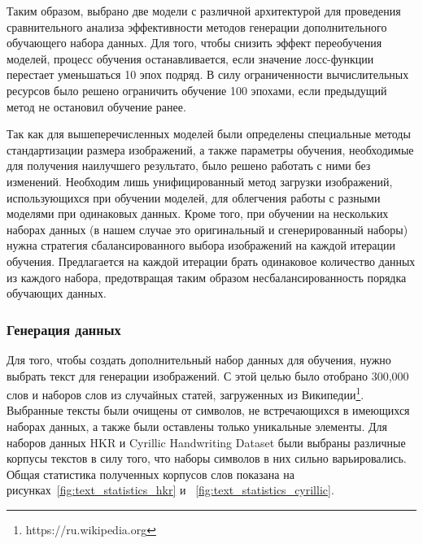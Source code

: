 Таким образом, выбрано две модели с различной архитектурой для проведения сравнительного анализа эффективности методов генерации дополнительного обучающего набора данных.
Для того, чтобы снизить эффект переобучения моделей, процесс обучения останавливается, если значение лосс-функции перестает уменьшаться 10 эпох подряд.
В силу ограниченности вычислительных ресурсов было решено ограничить обучение 100 эпохами, если предыдущий метод не остановил обучение ранее.

Так как для вышеперечисленных моделей были определены специальные методы стандартизации размера изображений, а также параметры обучения,
необходимые для получения наилучшего результато, было решено работать с ними без изменений.
Необходим лишь унифицированный метод загрузки изображений, использующихся при обучении моделей, для облегчения работы с разными моделями при одинаковых данных.
Кроме того, при обучении на нескольких наборах данных (в нашем случае это оригинальный и сгенерированный наборы) нужна
стратегия сбалансированного выбора изображений на каждой итерации обучения.
Предлагается на каждой итерации брать одинаковое количество данных из каждого набора,
предотвращая таким образом несбалансированность порядка обучающих данных.

\subsubsection{Генерация данных}

Для того, чтобы создать дополнительный набор данных для обучения, нужно выбрать текст для генерации изображений.
С этой целью было отобрано 300,000 слов и наборов слов из случайных статей, загруженных из Википедии\footnote{https://ru.wikipedia.org}.
Выбранные тексты были очищены от символов, не встречающихся в имеющихся наборах данных, а также были оставлены только уникальные элементы.
Для наборов данных HKR и Cyrillic Handwriting Dataset были выбраны различные корпусы текстов в силу того, что наборы символов в них сильно варьировались.
Общая статистика полученных корпусов слов показана на рисунках~\ref{fig:text_statistics_hkr} и ~\ref{fig:text_statistics_cyrillic}.

